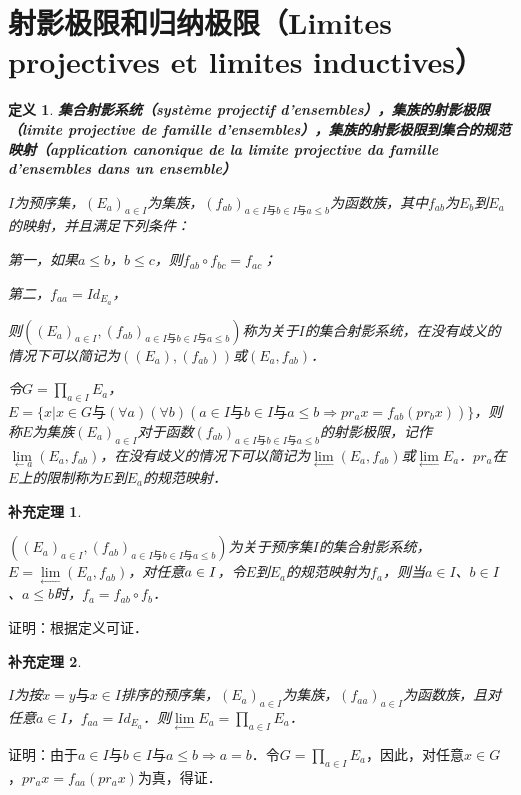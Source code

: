 \documentclass[12pt, a4paper, oneside]{book}
\newtheorem{cor}{补充定理}
\newtheorem{de}{定义}
\begin{document}
		\section{射影极限和归纳极限（Limites projectives et limites inductives）}		
			\begin{de}
				\textbf{集合射影系统（système projectif d'ensembles），集族的射影极限（limite projective de famille d'ensembles），集族的射影极限到集合的规范映射（application canonique de la limite projective da famille d'ensembles dans un ensemble）}
				\par
				$I$为预序集，$(E_a)_{a\in I}$为集族，$(f_{ab})_{a\in I\text{与}b\in I\text{与}a\leq b}$为函数族，其中$f_{ab}$为$E_b$到$E_a$的映射，并且满足下列条件：
				\par
				第一，如果$a\leq b$，$b\leq c$，则$f_{ab}\circ f_{bc}=f_{ac}$；
				\par
				第二，$f_{aa}=Id_{E_a}$，
				\par
				则$((E_a)_{a\in I}, (f_{ab})_{a\in I\text{与}b\in I\text{与}a\leq b})$称为关于$I$的集合射影系统，在没有歧义的情况下可以简记为$((E_a), (f_{ab}))$或$(E_a, f_{ab})$．
				\par
				令$G=\prod\limits_{a\in I}E_a$，$E=\{x|x\in G\text{与}(\forall a)(\forall b)(a\in I\text{与}b\in I\text{与}a\leq b\Rightarrow pr_ax=f_{ab}(pr_bx))\}$，则称$E$为集族$(E_a)_{a\in I}$对于函数$(f_{ab})_{a\in I\text{与}b\in I\text{与}a\leq b}$的射影极限，记作$\lim\limits_{\gets a}(E_a, f_{ab})$，在没有歧义的情况下可以简记为$\lim\limits_\gets(E_a, f_{ab})$或$\lim\limits_\gets E_a$．$pr_a$在$E$上的限制称为$E$到$E_a$的规范映射．
			\end{de}
			
			\begin{cor}\label{cor411}
				\hfill\par
				$((E_a)_{a\in I}, (f_{ab})_{a\in I\text{与}b\in I\text{与}a\leq b})$为关于预序集$I$的集合射影系统，$E=\lim\limits_\gets(E_a, f_{ab})$，对任意$a\\\in I$，令$E$到$E_a$的规范映射为$f_a$，则当$a\in I$、$b\in I$、$a\leq b$时，$f_a=f_{ab}\circ f_b$．
			\end{cor}
			证明：根据定义可证．
			
			\begin{cor}\label{cor412}
				\hfill\par
				$I$为按$x=y\text{与}x\in I$排序的预序集，$(E_a)_{a\in I}$为集族，$(f_{aa})_{a\in I}$为函数族，且对任意$a\in I$，$f_{aa}=Id_{E_a}$．则$\lim\limits_\gets E_a= \prod\limits_{a\in I}E_a$．
			\end{cor}
			证明：由于$a\in I\text{与}b\in I\text{与}a\leq b\Rightarrow a=b$．令$G=\prod\limits_{a\in I}E_a$，因此，对任意$x\in G$，$pr_ax=f_{aa}(pr_ax)$为真，得证．
			
\end{document}
